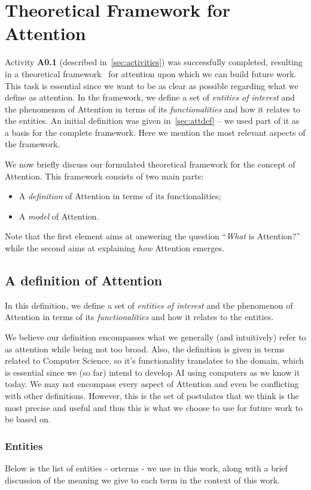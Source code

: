 \documentclass[12pt]{article}
\begin{document}
\section{Theoretical Framework for Attention}
Activity \textbf{A0.1} (described in~\ref{sec:activities}) was successfully completed,
resulting in a theoretical framework~\cite{ref:framework} for attention upon which we can build future work.
This task is essential since we want to be as clear as possible regarding what we define as attention.
In the framework, we define a set of \emph{entities of interest} and the phenomenon of Attention in terms of
its \emph{functionalities} and how it relates to the entities.
An initial definition was given in~\ref{sec:attdef} -- we used part of it as a basis for the complete framework.
Here we mention the most relevant aspects of the framework.

We now briefly discuss our formulated theoretical framework for the concept of Attention.
This framework consists of two main parts:
\begin{itemize}
    \item A \emph{definition} of Attention in terms of its functionalities;
    \item A \emph{model} of Attention.
\end{itemize}
Note that the first element aims at answering the question ``\emph{What} is Attention?''
while the second aims at explaining \emph{how} Attention emerges.

\subsection{A definition of Attention}
\label{sec:definition}
In this definition, we define a set of \emph{entities of interest} and the phenomenon of Attention in terms of
its \emph{functionalities} and how it relates to the entities.

We believe our definition encompasses what we generally (and intuitively) refer to as attention while being not too broad.
Also, the definition is given in terms related to Computer Science, so it's  functionality translates to the domain,
which is essential since we (so far) intend to develop AI using computers as we know it today.
We may not encompass every aspect of Attention and even be conflicting with other definitions.
However, this is the set of postulates that we think is the most precise and useful and thus this is
what we choose to use for future work to be based on.

\subsubsection{Entities}
Below is the list of entities - orterms - we use in this work, along with a brief discussion of the meaning
we give to each term in the context of this work.
\end{document}
